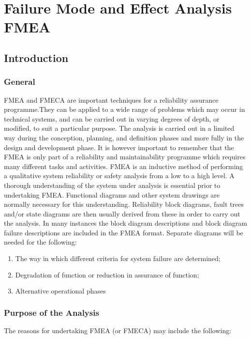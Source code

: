 \documentclass[./dissertation.tex]{subfiles}
\begin{document}
\chapter{Failure Mode and Effect Analysis FMEA}

\section{Introduction}
\subsection{General}
FMEA and FMECA are important techniques for a reliability assurance programme.They can be applied to a wide range of problems which may occur in technical systems, and can be carried out in varying degrees of depth, or modified, to suit a particular purpose. The analysis is carried out in a limited way during the conception, planning, and definition phases and more fully in the design and development phase. It is however important to remember that the FMEA is only part of a reliability and
maintainability programme which requires many different tasks and activities. FMEA is an inductive method of performing a qualitative system reliability or safety analysis from a low to a high level. A thorough understanding of the system under analysis is essential prior to undertaking FMEA. Functional diagrams and other system drawings are normally necessary for this understanding. Reliability block diagrams, fault trees and/or state diagrams are then usually derived from these in order to
carry out the analysis. In many instances the block diagram descriptions and block diagram failure descriptions are included in the FMEA format. Separate diagrams will be needed for the
following:
\begin{enumerate}
    \item The way in which different criteria for system failure are determined;
    \item Degradation of function or reduction in assurance of function;
    \item Alternative operational phases
\end{enumerate}

\subsection{Purpose of the Analysis}
The reasons for undertaking FMEA (or FMECA) may include the following:
\end{document}
